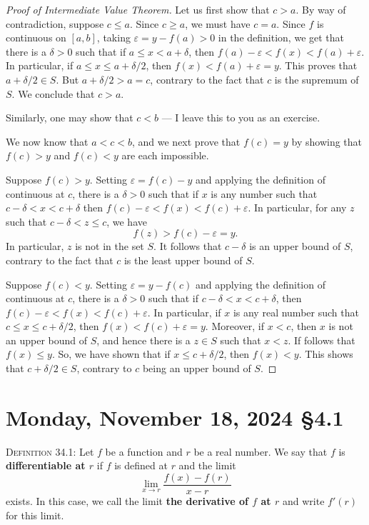 \documentclass[12pt]{amsart}
\def\Mo{Monday}
\def\d{\delta}
\def\e{\varepsilon}
\numberwithin{equation}{section}
\theoremstyle{plain} %
\newcommand{\Nov}[3]{\section{#2, November #1, 2024 \quad \S#3}}
\theoremstyle{definition}
\theoremstyle{remark}
\begin{document}
\begin{enumerate}
\begin{framed}
\begin{proof}[Proof of Intermediate Value Theorem]
Let us first show that $c > a$. By way of contradiction, suppose $c \leq a$. Since $c \geq a$, we must have $c = a$. 
Since $f$ is continuous on $[a,b]$, taking $\e = y
- f(a) > 0$ in the definition, we get that there is a $\d>0$ such that if $a \leq x < a +
\d$, then $f(a) - \e < f(x) < f(a) + \e$. In particular, if $a \leq x \leq a + \d/2$, then $f(x) < f(a) + \e = y$.
This proves that $a+ \d/2 \in S$. But $a + \d/2 > a = c$, contrary to the fact that $c$ is the supremum of $S$. We conclude that $c > a$. 


Similarly, one may show that $c < b$ --- I leave this to you as an exercise.

We now know that $a < c < b$, and 
we next prove that $f(c) = y$ by showing that $f(c) > y$ and $f(c) < y$ are each impossible.

Suppose $f(c) > y$. 
Setting $\e = f(c) - y$ and applying the definition of continuous at $c$, there is a $\d >0$ such that if $x$ is any number such that $c
- \d < x < c + \d$ then $f(c) - \e < f(x) < f(c) + \e$. In particular, for any $z$ such that $c - \d < z \leq c$, 
we have
$$
f(z) > f(c) - \e = y.
$$
In particular, $z$ is not in the set $S$. It follows that $c - \d$ is an upper bound of $S$, contrary to the fact that $c$ is the least upper bound of $S$. 



Suppose $f(c) < y$. 
Setting $\e = y - f(c)$ and applying the definition of continuous at $c$, there is a $\d >0$ such that if $c - \d < x < c + \d$, 
then $f(c) - \e < f(x) < f(c) + \e$. In particular, 
if $x$ is any real number such that $c \leq x \leq c + \d/2$, then $f(x) < f(c) + \e = y$. Moreover, if $x < c$, then $x$ is not an upper bound of $S$, and hence there is a $z \in
S$ such that $x < z$. If follows that $f(x) \leq y$.
So, we have shown that if $x \leq c + \d/2$, then $f(x) < y$. This shows that
 $c + \d/2 \in S$, contrary to $c$ being an upper bound of $S$. 
 \end{proof}
\end{framed}


\end{enumerate}

\newpage
   
\Nov{18}{\Mo}{4.1}

\begin{framed} 


 \noindent \textsc{Definition 34.1:}  Let $f$ be a function and $r$ be a real number. We say that $f$ is \textbf{differentiable at $r$} if $f$ is defined at $r$ and the limit
\[ \lim_{x\to r} \frac{ f(x) - f(r) }{x-r}\]
exists. In this case, we call the limit \textbf{the derivative of $f$ at $r$} and write $f'(r)$ for this limit. 
 
 
 
 
 \end{framed}
\end{document}
